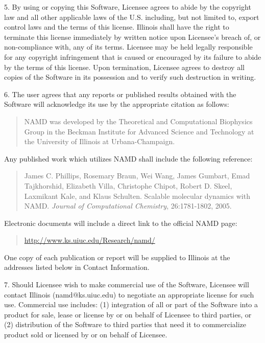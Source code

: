 5. By using or copying this Software, Licensee agrees to abide by the
copyright law and all other applicable laws of the U.S. including, but 
not limited to, export control laws and the terms of this license. 
Illinois shall have the right to terminate this license immediately by 
written notice upon Licensee's breach of, or non-compliance with, any 
of its terms. Licensee may be held legally responsible for any copyright 
infringement that is caused or encouraged by its failure to abide by 
the terms of this license. Upon termination, Licensee agrees to destroy 
all copies of the Software in its possession and to verify such 
destruction in writing.

6. The user agrees that any reports or published results obtained 
with the Software will acknowledge its use by the appropriate citation 
as follows: 

\begin{quote}
 NAMD was developed by the Theoretical and Computational Biophysics Group in the 
 Beckman Institute for Advanced Science and Technology at the 
 University of Illinois at Urbana-Champaign.
\end{quote}

Any published work which utilizes NAMD shall include the following reference: 

\begin{quote}
 James C. Phillips, Rosemary Braun, Wei Wang, James Gumbart,
 Emad Tajkhorshid, Elizabeth Villa, Christophe Chipot, Robert D. Skeel,
 Laxmikant Kale, and Klaus Schulten. Scalable molecular dynamics with NAMD.
 {\it Journal of Computational Chemistry}, 26:1781-1802, 2005.
\end{quote}

Electronic documents will include a direct link to the official NAMD page:

\begin{quote}
\url{http://www.ks.uiuc.edu/Research/namd/}
\end{quote}

One copy of each publication or report will be supplied to Illinois 
at the addresses listed below in Contact Information.

7. Should Licensee wish to make commercial use of the Software, Licensee 
will contact Illinois (namd@ks.uiuc.edu) to negotiate an appropriate 
license for such use. Commercial use includes: (1) integration of all 
or part of the Software into a product for sale, lease or license by or 
on behalf of Licensee to third parties, or (2) distribution of the 
Software to third parties that need it to commercialize product sold or 
licensed by or on behalf of Licensee.

